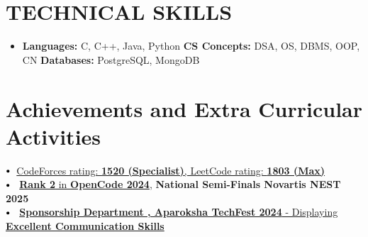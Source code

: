 \documentclass[letterpaper,9pt]{article}
\newcommand{\resumeSubHeadingListStart}{\begin{itemize}[leftmargin=0.0in, label={}]}
\newcommand{\resumeSubHeadingListEnd}{\end{itemize}}
\newcommand{\resumeItemListEnd}{\end{itemize}\vspace{-5pt}}
\newcommand\sbullet[1][.5]{\mathbin{\vcenter{\hbox{\scalebox{#1}{$\bullet$}}}}}
\begin{document}



\section{TECHNICAL SKILLS}
\resumeSubHeadingListStart
  \item \textbf{Languages:} C, C++, Java, Python \quad
        \textbf{CS Concepts:} DSA, OS, DBMS, OOP, CN\quad
        \textbf{Databases:} PostgreSQL, MongoDB \quad
        

\resumeSubHeadingListEnd

 
\section{Achievements and Extra Curricular Activities}

$\sbullet[.75] \hspace{0.1cm}$ {\href{#}{CodeForces rating: \textbf{1520 (Specialist)}, LeetCode rating: \textbf{1803 (Max)}}} \\
$\sbullet[.75] \hspace{0.2cm}$ {\href{#}{\textbf{Rank 2} in \textbf{OpenCode 2024}}}, {\textbf{National Semi-Finals Novartis NEST 2025}} \\
$\sbullet[.75] \hspace{0.2cm}$ {\href{#}{\textbf{Sponsorship Department , Aparoksha TechFest 2024} - Displaying \textbf{Excellent Communication Skills}}}
\end{document}
